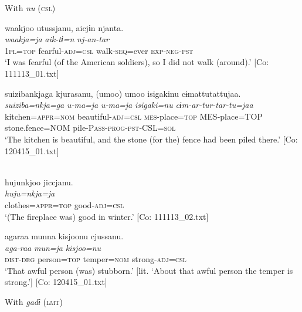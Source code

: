 \exi{}  With \textit{nu} (\textsc{csl})

\ex \label{ex:9.44c} %
    \glll  waakjoo  utussjanu,  aicjɨn  njanta.\\
      \textit{waakja=ja}  \textit{}  \textit{aik-tɨ=n}  \textit{nj-an-tar}\\
      1\textsc{pl}=\textsc{top}  fearful-\textsc{adj}=\textsc{csl}  walk-\textsc{seq}=ever  \textsc{exp}-\textsc{neg}-\textsc{pst}\\
      \glt       ‘I was fearful (of the American soldiers), so I did not walk (around).’ [Co: 111113\_01.txt]

\ex \label{ex:9.44d} %
 \glll  {\textbar}suiziba{\textbar}nkjaga  kjurasanu,  (umoo)  umoo  isigakinu  cɨmattutattujaa.\\
      \textit{suiziba=nkja=ga}  \textit{}  \textit{u-ma=ja}  \textit{u-ma=ja}  \textit{isigaki=nu}  \textit{cɨm-ar-tur-tar-tu=jaa}\\
      kitchen=\textsc{appr}=\textsc{nom}  beautiful-\textsc{adj}=\textsc{csl}  \textsc{mes}-place=\textsc{top}   MES-place=TOP  stone.fence=NOM  pile-P\textsc{ass}-\textsc{prog}-\textsc{pst}-CSL=\textsc{sol}      \\
      \glt       ‘The kitchen is beautiful, and the stone (for the) fence had been piled there.’ [Co: 120415\_01.txt]

\ex{}\\
    \glll  hujunkjoo  jiccjanu.\\
      \textit{huju=nkja=ja}  \textit{}\\
      clothes=\textsc{appr}=\textsc{top}  good-\textsc{adj}=\textsc{csl}\\
      \glt       ‘(The fireplace was) good in winter.’ [Co: 111113\_02.txt]

\ex %
 \glll  agaraa  munna  kisjoonu  cjussanu.\\
      \textit{aga-raa}  \textit{mun=ja}  \textit{kisjoo=nu}  \textit{}\\
      \textsc{dist}-\textsc{drg}  person=\textsc{top}  temper=\textsc{nom}  strong-\textsc{adj}=\textsc{csl}\\
      \glt       ‘That awful person (was) stubborn.’ [lit. ‘About that awful person the temper is strong.’] [Co: 120415\_01.txt]

\exi{}  With \textit{gadɨ} (\textsc{lmt})

